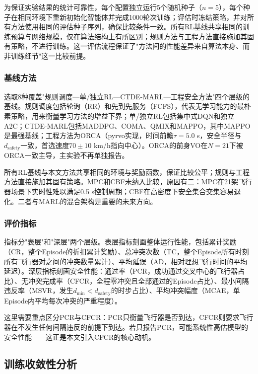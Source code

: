 \documentclass[12pt,a4paper,UTF8]{ctexart}
\begin{document}
为保证实验结果的统计可靠性，每个配置独立运行5个随机种子（$n=5$），每个种子在相同环境下重新初始化智能体并完成1000轮次训练；评估时冻结策略，并对所有方法使用相同的评估种子序列，确保比较条件一致。所有RL基线共享相同的训练预算与网络规模，仅在算法结构上有所区别；规则方法与工程方法直接施加其固有策略，不进行训练。这一评估流程保证了"方法间的性能差异来自算法本身、而非训练细节"这一比较前提。

\subsubsection{基线方法}

选取8种覆盖"规则调度—单/独立RL—CTDE-MARL—工程安全方法"四个层级的基线。规则调度包括轮询（RR）和先到先服务（FCFS），代表无学习能力的最朴素策略，用来衡量学习方法的增益下界；单/独立RL包括集中式DQN和独立A2C；CTDE-MARL包括MADDPG、COMA、QMIX和MAPPO，其中MAPPO是最强基线；工程方法为ORCA\cite{ref4}（pyrvo实现，时间前瞻$\tau=5.0$ s，安全半径与$d_{\text{safety}}$一致，首选速度$70\pm10$ km/h指向中心）。ORCA的前身VO在$N=21$下被ORCA一致主导，主实验不再单独报告。

所有RL基线与本文方法共享相同的环境与奖励函数，保证比较公平；规则与工程方法直接施加其固有策略。MPC和CBF未纳入比较，原因有二：MPC在21架飞行器场景下实时性难以满足0.5 s控制周期；CBF在高密度下安全集合交集容易退化。二者与MARL的混合架构是重要的未来方向。

\subsubsection{评价指标}

指标分"表层"和"深层"两个层级。表层指标刻画整体运行性能，包括累计奖励（CR，整个Episode的折扣累计奖励）、总冲突次数（TC，整个Episode所有时刻所有飞行器对之间的冲突数量累计）、平均延误（AD，相对理想飞行时间的平均延迟）。深层指标刻画安全性能：通过率（PCR，成功通过交叉中心的飞行器占比）、无冲突完成率（CFCR，全程零冲突且全部通过的Episode占比）、最小间隔违反率（MSVR，发生$d_{\min}<d_{\text{safety}}$的时步占比）、平均冲突幅度（MCAE，单Episode内平均每次冲突的严重程度）。

这里需要重点区分PCR与CFCR：PCR只衡量飞行器是否到达，CFCR则要求飞行器在不发生任何间隔违反的前提下到达。若只报告PCR，可能系统性高估模型的安全性能——这正是本文引入CFCR的核心动机。

\subsection{训练收敛性分析}
\end{document}

